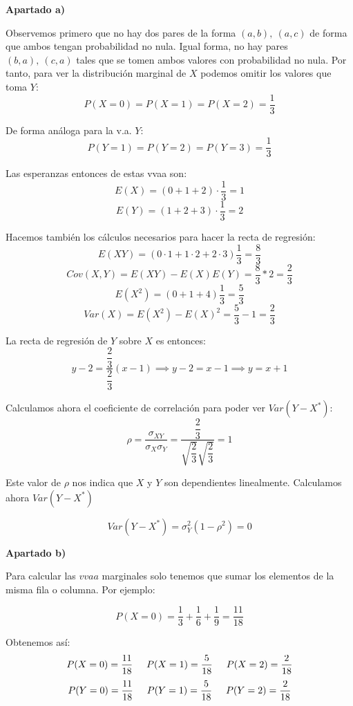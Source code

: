 \documentclass[openany]{book}
\begin{document}
\begin{exercise}
    $  $
    \begin{flushright}
        \textbf{Apartado a)}
    \end{flushright}

    Observemos primero que no hay dos pares de la forma $ (a,b),\ (a,c) $ de forma que ambos tengan probabilidad no nula. Igual forma, no hay pares $ (b,a),\ (c,a) $ tales que se tomen ambos valores con probabilidad no nula. Por tanto, para ver la distribución marginal de $ X $ podemos omitir los valores que toma $ Y $:
    $$ P(X=0) = P(X=1) = P(X=2) = \dfrac{1}{3} $$

    De forma análoga para la v.a. $ Y $: 
    $$ P(Y=1) = P(Y=2) = P(Y=3) = \dfrac{1}{3} $$

    Las esperanzas entonces de estas vvaa son:
    $$ E(X) = (0+1+2)\cdot \dfrac{1}{3} = 1 $$
    $$ E(Y) = (1+2+3)\cdot \dfrac{1}{3} = 2 $$

    Hacemos también los cálculos necesarios para hacer la recta de regresión:
    $$ E(XY) = (0\cdot 1+1\cdot 2+2\cdot 3) \dfrac{1}{3} = \dfrac{8}{3} $$
    $$ Cov(X,Y) = E(XY) - E(X)E(Y) = \dfrac{8}{3}*2 =\dfrac{2}{3} $$
    $$ E(X^2) = (0+1+4)\dfrac{1}{3} = \dfrac{5}{3} $$
    $$ Var(X) = E(X^2)-E(X)^2 = \dfrac{5}{3}-1 = \dfrac{2}{3} $$

    La recta de regresión de $ Y $ sobre $ X $ es entonces:
    $$ y-2 = \dfrac{\dfrac{2}{3}}{\dfrac{2}{3}}(x-1) \implies y -2 = x-1 \implies y = x+1 $$

    Calculamos ahora el coeficiente de correlación para poder ver $ Var(Y-X^{*}) $:
    $$ \rho = \dfrac{\sigma_{XY}}{\sigma_{X}\sigma_{Y}} = \dfrac{\dfrac{2}{3}}{\sqrt{\dfrac{2}{3}}\sqrt{\dfrac{2}{3}}} = 1 $$

    Este valor de $ \rho $ nos indica que $ X $ y $ Y $ son dependientes linealmente. Calculamos ahora $ Var(Y-X^*) $

    $$ Var(Y-X^*) = \sigma_{Y}^2(1-\rho ^2) = 0 $$

    \begin{flushright}
        \textbf{Apartado b)}
    \end{flushright}

    Para calcular las $ vvaa $ marginales solo tenemos que sumar los elementos de la misma fila o columna. Por ejemplo:

    $$ P(X=0) = \dfrac{1}{3}+\dfrac{1}{6}+\dfrac{1}{9} = \dfrac{11}{18} $$

    Obtenemos así:
    $$ P(X=0) = \dfrac{11}{18} \hspace{5mm} P(X=1) = \dfrac{5}{18} \hspace{5mm} P(X=2) = \dfrac{2}{18}$$
    $$ P(Y=0) = \dfrac{11}{18} \hspace{5mm} P(Y=1) = \dfrac{5}{18} \hspace{5mm} P(Y=2) = \dfrac{2}{18} $$


\end{exercise}
\end{document}

